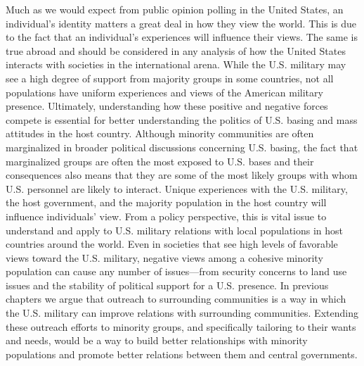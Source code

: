 Much as we would expect from public opinion polling in the United States, an individual's identity matters a great deal in how they view the world. This is due to the fact that an individual's experiences will influence their views. The same is true abroad and should be considered in any analysis of how the United States interacts with societies in the international arena. While the U.S. military may see a high degree of support from majority groups in some countries, not all populations have uniform experiences and views of the American military presence. Ultimately, understanding how these positive and negative forces compete is essential for better understanding the politics of U.S. basing and mass attitudes in the host country. Although minority communities are often marginalized in broader political discussions concerning U.S. basing, the fact that marginalized groups are often the most exposed to U.S. bases and their consequences also means that they are some of the most likely groups with whom U.S. personnel are likely to interact. Unique experiences with the U.S. military, the host government, and the majority population in the host country will influence individuals' view. From a policy perspective, this is vital issue to understand and apply to U.S. military relations with local populations in host countries around the world. Even in societies that see high levels of favorable views toward the U.S. military, negative views among a cohesive minority population can cause any number of issues---from security concerns to land use issues and the stability of political support for a U.S. presence. In previous chapters we argue that outreach to surrounding communities is a way in which the U.S. military can improve relations with surrounding communities. Extending these outreach efforts to minority groups, and specifically tailoring to their wants and needs, would be a way to build better relationships with minority populations and promote better relations between them and central governments.  

